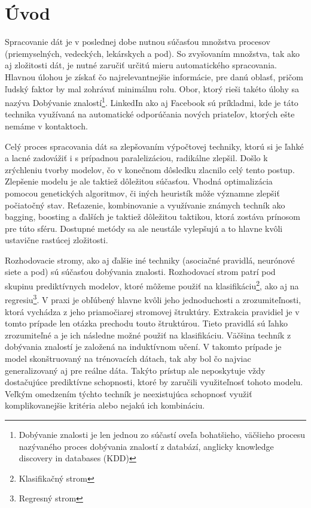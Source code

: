 \chapter{Úvod}
\setlength{\parskip}{0.5em}
\setlength{\parindent}{0cm}
Spracovanie dát je v poslednej dobe nutnou súčasťou množstva procesov (priemyselných, vedeckých, lekárskych a pod). So zvyšovaním množstva, tak ako aj zložitosti dát, je nutné zaručiť určitú mieru automatického spracovania. Hlavnou úlohou je získať čo najrelevantnejšie informácie, pre danú oblasť, pričom ľudský faktor by mal zohrávať minimálnu rolu. Obor, ktorý rieši takéto úlohy sa nazýva Dobývanie znalostí\footnote{Dobývanie znalosti je len jednou zo súčastí oveľa bohatšieho, väčšieho procesu nazývaného proces dobývania znalostí z databází, anglicky knowledge discovery in databases (KDD)}. LinkedIn ako aj Facebook sú príkladmi, kde je táto technika využívaná na automatické odporúčania nových priateľov, ktorých ešte nemáme v kontaktoch.

Celý proces spracovania dát sa zlepšovaním výpočtovej techniky, ktorú si je ľahké a lacné zadovážiť i s prípadnou paralelizáciou, radikálne zlepšil. Došlo k zrýchleniu tvorby modelov, čo v konečnom dôsledku zlacnilo celý tento postup. Zlepšenie modelu je ale taktiež dôležitou súčasťou. Vhodná optimalizácia pomocou genetických algoritmov, či iných heuristík môže významne zlepšiť počiatočný stav. Reťazenie, kombinovanie a využívanie známych techník ako bagging, boosting a ďalších je taktiež dôležitou taktikou, ktorá zostáva prínosom pre túto sféru. Dostupné metódy sa ale neustále vylepšujú a to hlavne kvôli ustavične rastúcej zložitosti.

Rozhodovacie stromy, ako aj ďalšie iné techniky (asociačné pravidlá, neurónové siete a pod) sú súčasťou dobývania znalosti. Rozhodovací strom patrí pod skupinu prediktívnych modelov, ktoré môžeme použiť na klasifikáciu\footnote{Klasifikačný strom}, ako aj na regresiu\footnote{Regresný strom}. V praxi je obľúbený hlavne kvôli jeho jednoduchosti a zrozumiteľnosti, ktorá vychádza z jeho priamočiarej stromovej štruktúry. Extrakcia pravidiel je v tomto prípade len otázka prechodu touto štruktúrou. Tieto pravidlá sú ľahko zrozumiteľné a je ich následne možné použiť na klasifikáciu. Väčšina techník z dobývania znalostí je založená na induktívnom učení. V takomto prípade je model skonštruovaný na trénovacích dátach, tak aby bol čo najviac generalizovaný aj pre reálne dáta. Takýto prístup ale neposkytuje vždy dostačujúce prediktívne schopnosti, ktoré by zaručili využiteľnosť tohoto modelu. Veľkým omedzením týchto techník je neexistujúca schopnosť využiť komplikovanejšie kritéria alebo nejakú ich kombináciu.

